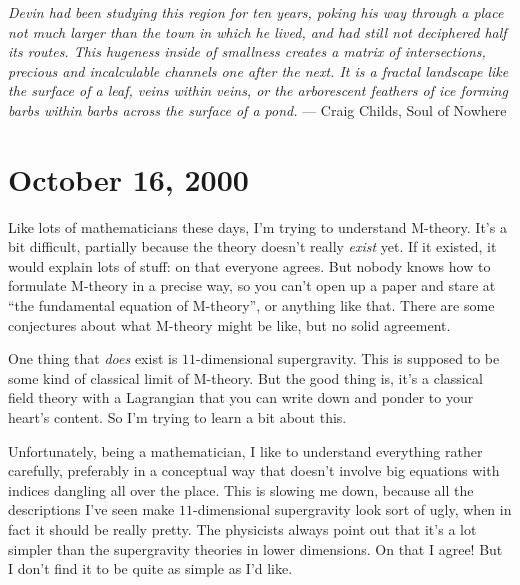 \documentclass{article}
\begin{document}
\emph{Devin had been studying this region for ten years, poking his way
through a place not much larger than the town in which he lived, and had
still not deciphered half its routes. This hugeness inside of smallness
creates a matrix of intersections, precious and incalculable channels
one after the next. It is a fractal landscape like the surface of a
leaf, veins within veins, or the arborescent feathers of ice forming
barbs within barbs across the surface of a pond.} --- Craig Childs, Soul
of Nowhere



\hypertarget{week158}{%
\section{October 16, 2000}\label{week158}}

Like lots of mathematicians these days, I'm trying to understand
M-theory. It's a bit difficult, partially because the theory doesn't
really \emph{exist} yet. If it existed, it would explain lots of stuff:
on that everyone agrees. But nobody knows how to formulate M-theory in a
precise way, so you can't open up a paper and stare at ``the fundamental
equation of M-theory'', or anything like that. There are some
conjectures about what M-theory might be like, but no solid agreement.

One thing that \emph{does} exist is \(11\)-dimensional supergravity.
This is supposed to be some kind of classical limit of M-theory. But the
good thing is, it's a classical field theory with a Lagrangian that you
can write down and ponder to your heart's content. So I'm trying to
learn a bit about this.

Unfortunately, being a mathematician, I like to understand everything
rather carefully, preferably in a conceptual way that doesn't involve
big equations with indices dangling all over the place. This is slowing
me down, because all the descriptions I've seen make \(11\)-dimensional
supergravity look sort of ugly, when in fact it should be really pretty.
The physicists always point out that it's a lot simpler than the
supergravity theories in lower dimensions. On that I agree! But I don't
find it to be quite as simple as I'd like.
\end{document}
